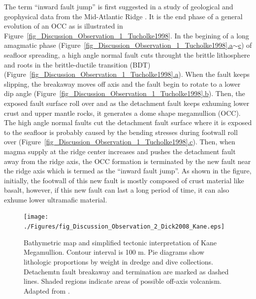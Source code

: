 The term ``inward fault jump'' is first suggested in a study of geological and geophysical data from the Mid-Atlantic Ridge \citep{Tucholke1998}. It is the end phase of a general evolution of an OCC as is illustrated in Figure~\hyperref[fig_Discussion_Observation_1_Tucholke1998]{\ref{fig_Discussion_Observation_1_Tucholke1998}}. In the begining of a long amagmatic phase (Figure~\hyperref[fig_Discussion_Observation_1_Tucholke1998]{\ref{fig_Discussion_Observation_1_Tucholke1998}.a$\sim$c}) of seafloor spreading, a high angle normal fault cuts throught the brittle lithosphere and roots in the brittle-ductile transition (BDT) (Figure~\hyperref[fig_Discussion_Observation_1_Tucholke1998]{\ref{fig_Discussion_Observation_1_Tucholke1998}.a}). When the fault keeps slipping, the breakaway moves off axis and the fault begin to rotate to a lower dip angle (Figure~\hyperref[fig_Discussion_Observation_1_Tucholke1998]{\ref{fig_Discussion_Observation_1_Tucholke1998}.b}). Then, the exposed fault surface roll over and as the detachment fault keeps exhuming lower crust and upper mantle rocks, it generates a dome shape megamullion (OCC). The high angle normal faults cut the detachment fault surface where it is exposed to the seafloor is probably caused by the bending stresses during footwall roll over (Figure~\hyperref[fig_Discussion_Observation_1_Tucholke1998]{\ref{fig_Discussion_Observation_1_Tucholke1998}.c}). Then, when magma supply at the ridge center increases and pushes the detachment fault away from the ridge axis, the OCC formation is terminated by the new fault near the ridge axis which is termed as the ``inward fault jump''. As shown in the figure, initially, the footwall of this new fault is mostly composed of crust material like basalt, however, if this new fault can last a long period of time, it can also exhume lower ultramafic material.

\begin{figure}[h]
 \centering
  \texttt{[image: ./Figures/fig\_Discussion\_Observation\_2\_Dick2008\_Kane.eps]}
 \caption[Bathymetric map and simplified tectonic interpretation of Kane Megamullion. Adapted from \citep{Dick2008}.]{Bathymetric map and simplified tectonic interpretation of Kane Megamullion. Contour interval is 100 m. Pie diagrams show lithologic proportions by weight in dredge and dive collections. Detachemtn fault breakaway and termination are marked as dashed lines. Shaded regions indicate areas of possible off-axis volcanism. Adapted from \citep{Dick2008}.}
 \label{fig_Discussion_Observation_2_Dick2008_Kane}
\end{figure}

